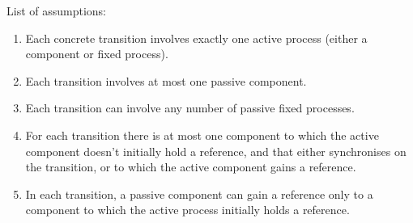 List of assumptions:
%
\begin{assumption}\label{assump}
\begin{enumerate}
\item Each concrete transition involves exactly one active process (either a
component or fixed process).

\item Each transition involves at most one passive component.

\item Each transition can involve any number of passive fixed processes.

\item\label{assump:max-one-extra-component}
For each transition there is at most one component to which the
active component doesn't initially hold a reference, and that either
synchronises on the transition, or to which the active component gains a
reference.

\item\label{assump:secondary-cpts-new-refs}
In each transition, a passive component can gain a reference only to a
component to which the active process initially holds a reference.
\end{enumerate}
\end{assumption}
